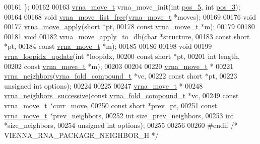 \begin{DoxyCode}
00161 \};
00162 
00163 \hyperlink{group__neighbors_structvrna__move__s}{vrna\_move\_t} vrna\_move\_init(\textcolor{keywordtype}{int} \hyperlink{group__neighbors_a8af908c74786675a456d0f20cc8fcb9b}{pos\_5}, \textcolor{keywordtype}{int} \hyperlink{group__neighbors_a3849db905a45c4e399991df38705a36b}{pos\_3});
00164 
00168 \textcolor{keywordtype}{void} \hyperlink{group__neighbors_gad085062ae3aa7ee20783debe4a906fad}{vrna\_move\_list\_free}(\hyperlink{group__neighbors_structvrna__move__s}{vrna\_move\_t} *moves);
00169 
00176 \textcolor{keywordtype}{void}
00177 \hyperlink{group__neighbors_gacdbc5f609b46aeb07d2c7e015677a1e0}{vrna\_move\_apply}(\textcolor{keywordtype}{short}             *pt,
00178                 \textcolor{keyword}{const} \hyperlink{group__neighbors_structvrna__move__s}{vrna\_move\_t} *m);
00179 
00180 
00181 \textcolor{keywordtype}{void}
00182 vrna\_move\_apply\_to\_db(\textcolor{keywordtype}{char}              *structure,
00183                       \textcolor{keyword}{const} \textcolor{keywordtype}{short}       *pt,
00184                       \textcolor{keyword}{const} \hyperlink{group__neighbors_structvrna__move__s}{vrna\_move\_t} *m);
00185 
00186 
00198 \textcolor{keywordtype}{void}
00199 \hyperlink{group__neighbors_ga5ceb55ee56494b1f5b7aaa758cb722d1}{vrna\_loopidx\_update}(\textcolor{keywordtype}{int}               *loopidx,
00200                     \textcolor{keyword}{const} \textcolor{keywordtype}{short}       *pt,
00201                     \textcolor{keywordtype}{int}               length,
00202                     \textcolor{keyword}{const} \hyperlink{group__neighbors_structvrna__move__s}{vrna\_move\_t} *m);
00203 
00204 
00220 \hyperlink{group__neighbors_structvrna__move__s}{vrna\_move\_t} *
00221 \hyperlink{group__neighbors_ga249544953933c64a6a5a20b33e3d3bc9}{vrna\_neighbors}(\hyperlink{group__fold__compound_structvrna__fc__s}{vrna\_fold\_compound\_t} *vc,
00222                \textcolor{keyword}{const} \textcolor{keywordtype}{short}          *pt,
00223                \textcolor{keywordtype}{unsigned} \textcolor{keywordtype}{int}         options);
00224 
00225 
00247 \hyperlink{group__neighbors_structvrna__move__s}{vrna\_move\_t} *
00248 \hyperlink{group__neighbors_gae5aaa1c5a1f22e889843f3edbdd04714}{vrna\_neighbors\_successive}(\textcolor{keyword}{const} \hyperlink{group__fold__compound_structvrna__fc__s}{vrna\_fold\_compound\_t}  *vc,
00249                           \textcolor{keyword}{const} \hyperlink{group__neighbors_structvrna__move__s}{vrna\_move\_t}           *curr\_move,
00250                           \textcolor{keyword}{const} \textcolor{keywordtype}{short}                 *prev\_pt,
00251                           \textcolor{keyword}{const} \hyperlink{group__neighbors_structvrna__move__s}{vrna\_move\_t}           *prev\_neighbors,
00252                           \textcolor{keywordtype}{int}                         size\_prev\_neighbors,
00253                           \textcolor{keywordtype}{int}                         *size\_neighbors,
00254                           \textcolor{keywordtype}{unsigned} \textcolor{keywordtype}{int}                options);
00255 
00256 
00260 \textcolor{preprocessor}{#endif }\textcolor{comment}{/* VIENNA\_RNA\_PACKAGE\_NEIGHBOR\_H */}\textcolor{preprocessor}{}
\end{DoxyCode}
